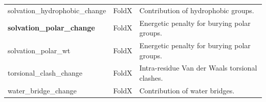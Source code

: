 \begin{table}[!htb]
\begin{tabular}{ l | l | p{8cm} }
		solvation\_hydrophobic\_change        & FoldX          & Contribution of hydrophobic groups.                                                                 \\
		\textbf{solvation\_polar\_change}     & FoldX          & Energetic penalty for burying polar groups.                                                         \\
		solvation\_polar\_wt                  & FoldX          & Energetic penalty for burying polar groups.                                                         \\
		torsional\_clash\_change              & FoldX          & Intra-residue Van der Waals torsional clashes.                                                      \\
		water\_bridge\_change                 & FoldX          & Contribution of water bridges.                                                                      \\
		\bottomrule
	\end{tabular}
\end{table}


